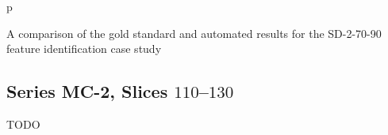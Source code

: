 \begin{stusubfig}{p}
	\hspace{4mm}%
\caption{A comparison of the gold standard and automated results for the SD-2-70-90 feature identification case study}
\label{fig:validation-SD-2-70-90}
\end{stusubfig}

\subsection{Series MC-2, Slices $110$--$130$}

TODO


